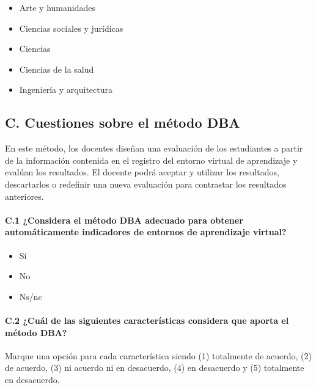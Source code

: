 \begin{mdframed}[style=cuestionarioST]
			\begin{itemize}
				\item Arte y humanidades
				\item Ciencias sociales y jurídicas
				\item Ciencias
				\item Ciencias de la salud
				\item Ingeniería y arquitectura
			\end{itemize}
\end{mdframed}

	
\newpage

	\subsection*{C. Cuestiones sobre el método DBA}

\begin{mdframed}[style=cuestionarioST]
	En este método, los docentes diseñan una evaluación de los estudiantes a partir de la información contenida en el registro del entorno virtual de aprendizaje y evalúan los resultados. El docente podrá aceptar y utilizar los resultados, descartarlos o redefinir una nueva evaluación para contrastar los resultados anteriores.
\end{mdframed}


	\paragraph*{C.1 ¿Considera el método DBA adecuado para obtener automáticamente indicadores de entornos de aprendizaje virtual?}

\begin{mdframed}[style=cuestionarioST]
			\begin{itemize}
				\item Sí
				\item No
				\item Ns/nc
			\end{itemize}
\end{mdframed}


	\paragraph*{C.2 ¿Cuál de las siguientes características considera que aporta el método DBA?}

Marque una opción para cada característica siendo (1) totalmente de acuerdo, (2) de acuerdo, (3) ni acuerdo ni en desacuerdo, (4) en desacuerdo y (5) totalmente en desacuerdo.

